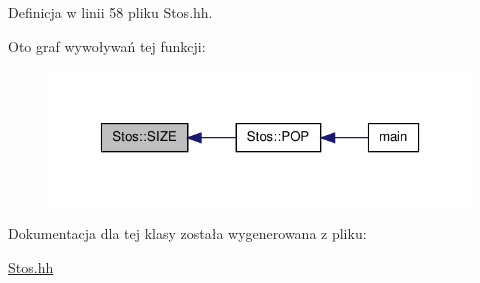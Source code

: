 Definicja w linii 58 pliku Stos.hh.



Oto graf wywoływań tej funkcji:
\nopagebreak
\begin{figure}[H]
\begin{center}
\leavevmode
\includegraphics[width=320pt]{class_stos_a6ff0d2aa5946c0dc413e3236ca99fd26_icgraph}
\end{center}
\end{figure}




Dokumentacja dla tej klasy została wygenerowana z pliku:\begin{DoxyCompactItemize}
\item 
\hyperlink{_stos_8hh}{Stos.hh}\end{DoxyCompactItemize}

